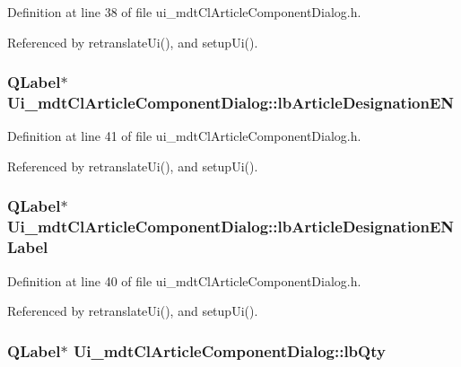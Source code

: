 Definition at line 38 of file ui\-\_\-mdt\-Cl\-Article\-Component\-Dialog.\-h.



Referenced by retranslate\-Ui(), and setup\-Ui().

\hypertarget{class_ui__mdt_cl_article_component_dialog_a37234972b732316dc0ab68ae949e7b48}{
\subsubsection[{lb\-Article\-Designation\-E\-N}]{\setlength{\rightskip}{0pt plus 5cm}Q\-Label$\ast$ Ui\-\_\-mdt\-Cl\-Article\-Component\-Dialog\-::lb\-Article\-Designation\-E\-N}}\label{class_ui__mdt_cl_article_component_dialog_a37234972b732316dc0ab68ae949e7b48}


Definition at line 41 of file ui\-\_\-mdt\-Cl\-Article\-Component\-Dialog.\-h.



Referenced by retranslate\-Ui(), and setup\-Ui().

\hypertarget{class_ui__mdt_cl_article_component_dialog_a977d617bb065a68cc420fbc4dcc74565}{
\subsubsection[{lb\-Article\-Designation\-E\-N\-Label}]{\setlength{\rightskip}{0pt plus 5cm}Q\-Label$\ast$ Ui\-\_\-mdt\-Cl\-Article\-Component\-Dialog\-::lb\-Article\-Designation\-E\-N\-Label}}\label{class_ui__mdt_cl_article_component_dialog_a977d617bb065a68cc420fbc4dcc74565}


Definition at line 40 of file ui\-\_\-mdt\-Cl\-Article\-Component\-Dialog.\-h.



Referenced by retranslate\-Ui(), and setup\-Ui().

\hypertarget{class_ui__mdt_cl_article_component_dialog_aa9b82d5b45f45c5db3d5d2755cb28ecb}{
\subsubsection[{lb\-Qty}]{\setlength{\rightskip}{0pt plus 5cm}Q\-Label$\ast$ Ui\-\_\-mdt\-Cl\-Article\-Component\-Dialog\-::lb\-Qty}}\label{class_ui__mdt_cl_article_component_dialog_aa9b82d5b45f45c5db3d5d2755cb28ecb}


